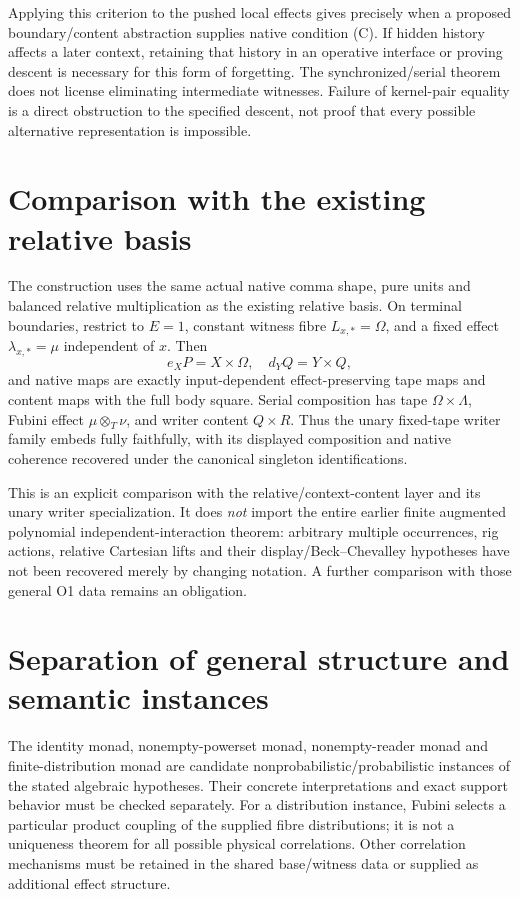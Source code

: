 \documentclass[11pt]{article}
\begin{document}
Applying this criterion to the pushed local effects gives precisely when a proposed boundary/content abstraction supplies native condition (C). If hidden history affects a later context, retaining that history in an operative interface or proving descent is necessary for this form of forgetting. The synchronized/serial theorem does not license eliminating intermediate witnesses. Failure of kernel-pair equality is a direct obstruction to the specified descent, not proof that every possible alternative representation is impossible.

\section{Comparison with the existing relative basis}
The construction uses the same actual native comma shape, pure units and balanced relative multiplication as the existing relative basis. On terminal boundaries, restrict to $E=1$, constant witness fibre $L_{x,*}=\Omega$, and a fixed effect $\lambda_{x,*}=\mu$ independent of $x$. Then
\[
 e_XP=X\times\Omega,\quad d_YQ=Y\times Q,
\]
and native maps are exactly input-dependent effect-preserving tape maps and content maps with the full body square. Serial composition has tape $\Omega\times\Lambda$, Fubini effect $\mu\otimes_T\nu$, and writer content $Q\times R$. Thus the unary fixed-tape writer family embeds fully faithfully, with its displayed composition and native coherence recovered under the canonical singleton identifications.

This is an explicit comparison with the relative/context-content layer and its unary writer specialization. It does \emph{not} import the entire earlier finite augmented polynomial independent-interaction theorem: arbitrary multiple occurrences, rig actions, relative Cartesian lifts and their display/Beck--Chevalley hypotheses have not been recovered merely by changing notation. A further comparison with those general O1 data remains an obligation.

\section{Separation of general structure and semantic instances}
The identity monad, nonempty-powerset monad, nonempty-reader monad and finite-distribution monad are candidate nonprobabilistic/probabilistic instances of the stated algebraic hypotheses. Their concrete interpretations and exact support behavior must be checked separately. For a distribution instance, Fubini selects a particular product coupling of the supplied fibre distributions; it is not a uniqueness theorem for all possible physical correlations. Other correlation mechanisms must be retained in the shared base/witness data or supplied as additional effect structure.
\end{document}
